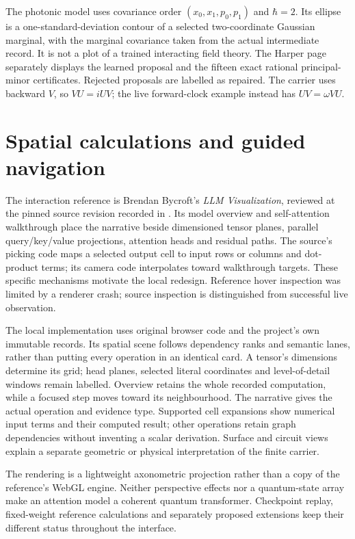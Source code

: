 The photonic model uses covariance order $(x_0,x_1,p_0,p_1)$ and
$\hbar=2$. Its ellipse is a one-standard-deviation contour of a selected
two-coordinate Gaussian marginal, with the marginal covariance taken from
the actual intermediate record. It is not a plot of a trained interacting
field theory. The Harper page separately displays the learned proposal and
the fifteen exact rational principal-minor certificates. Rejected proposals
are labelled as repaired. The carrier uses backward $V$, so $VU=iUV$;
the live forward-clock example instead has $UV=\omega VU$.

\section{Spatial calculations and guided navigation}
The interaction reference is Brendan Bycroft's \emph{LLM Visualization},
reviewed at the pinned source revision recorded in
.
Its model overview and self-attention walkthrough place the narrative
beside dimensioned tensor planes, parallel query/key/value projections,
attention heads and residual paths. The source's picking code maps a
selected output cell to input rows or columns and dot-product terms;
its camera code interpolates toward walkthrough targets. These specific
mechanisms motivate the local redesign. Reference hover inspection was
limited by a renderer crash; source inspection is distinguished from
successful live observation.

The local implementation uses original browser code and the project's
own immutable records. Its spatial scene follows dependency ranks and
semantic lanes, rather than putting every operation in an identical card.
A tensor's dimensions determine its grid; head planes, selected literal
coordinates and level-of-detail windows remain labelled. Overview retains
the whole recorded computation, while a focused step moves toward its
neighbourhood. The narrative gives the actual operation and evidence type.
Supported cell expansions show numerical input terms and their computed
result; other operations retain graph dependencies without inventing a
scalar derivation. Surface and circuit views explain a separate geometric
or physical interpretation of the finite carrier.

The rendering is a lightweight axonometric projection rather than a copy
of the reference's WebGL engine. Neither perspective effects nor a
quantum-state array make an attention model a coherent quantum transformer.
Checkpoint replay, fixed-weight reference calculations and separately
proposed extensions keep their different status throughout the interface.

